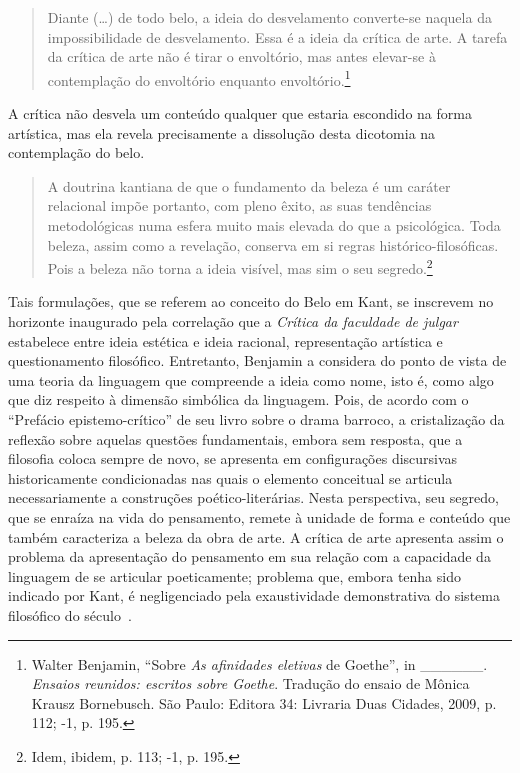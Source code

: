 \begin{quote}
Diante (\ldots{}) de todo belo, a ideia do desvelamento converte-se naquela
da impossibilidade de desvelamento. Essa é a ideia da crítica de arte. A
tarefa da crítica de arte não é tirar o envoltório, mas antes elevar-se
à contemplação do envoltório enquanto envoltório.\footnote{Walter
  Benjamin, ``Sobre \emph{As afinidades eletivas} de Goethe'', in
  \_\_\_\_\_\_. \emph{Ensaios reunidos: escritos sobre Goethe}. Tradução
  do ensaio de Mônica Krausz Bornebusch. São Paulo: Editora 34: Livraria
  Duas Cidades, 2009, p. 112;  -1, p. 195.}
\end{quote}

A crítica não desvela um conteúdo qualquer que estaria escondido na
forma artística, mas ela revela precisamente a dissolução desta
dicotomia na contemplação do belo.

\begin{quote}
A doutrina kantiana de que o fundamento da beleza é um caráter
relacional impõe portanto, com pleno êxito, as suas tendências
metodológicas numa esfera muito mais elevada do que a psicológica. Toda
beleza, assim como a revelação, conserva em si regras
histórico-filosóficas. Pois a beleza não torna a ideia visível, mas sim
o seu segredo.\footnote{Idem, ibidem, p. 113;  -1, p. 195.}
\end{quote}

Tais formulações, que se referem ao conceito do Belo em Kant, se
inscrevem no horizonte inaugurado pela correlação que a \emph{Crítica da
faculdade de julgar} estabelece entre ideia estética e ideia racional,
representação artística e questionamento filosófico. Entretanto,
Benjamin a considera do ponto de vista de uma teoria da linguagem que
compreende a ideia como nome, isto é, como algo que diz respeito à
dimensão simbólica da linguagem. Pois, de acordo com o ``Prefácio
epistemo-crítico'' de seu livro sobre o drama barroco, a cristalização
da reflexão sobre aquelas questões fundamentais, embora sem resposta,
que a filosofia coloca sempre de novo, se apresenta em configurações
discursivas historicamente condicionadas nas quais o elemento conceitual
se articula necessariamente a construções poético-literárias. Nesta
perspectiva, seu segredo, que se enraíza na vida do pensamento, remete à
unidade de forma e conteúdo que também caracteriza a beleza da obra de
arte. A crítica de arte apresenta assim o problema da apresentação do
pensamento em sua relação com a capacidade da linguagem de se articular
poeticamente; problema que, embora tenha sido indicado por Kant, é
negligenciado pela exaustividade demonstrativa do sistema filosófico do
século~.

